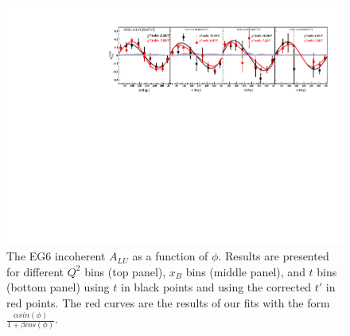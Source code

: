 \documentclass[a4paper,11pt,twoside]{article}
\begin{document}
\begin{figure}[tb]
\includegraphics[width=15cm]{fig/ALU_phi_p_t.pdf}
\caption{The EG6 incoherent $A_{LU}$ as a function of $\phi$. Results are 
   presented for different $Q^{2}$ bins (top panel), $x_{B}$ bins (middle 
panel), and $t$ bins (bottom panel) using $t$ in black points and using the 
corrected $t'$ in red points.  The red curves are the results of our fits with 
the form $\frac{\alpha sin(\phi)}{1+ \beta cos(\phi)}$.}
\label{fig:alu}
\end{figure}
\end{document}

